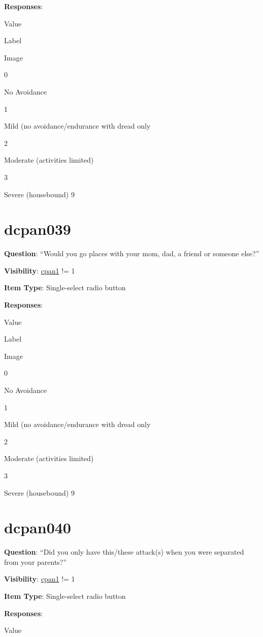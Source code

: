 \documentclass[]{book}
\begin{document}
\textbf{Responses}:

Value

Label

Image

0

No Avoidance

1

Mild (no avoidance/endurance with dread only

2

Moderate (activities limited)

3

Severe (housebound)\textbar{} 9

\hypertarget{dcpan039}{%
\section{dcpan039}\label{dcpan039}}

\textbf{Question}: ``Would you go places with your mom, dad, a friend or someone else?''

\textbf{Visibility}: \protect\hyperlink{cpan1}{cpan1} != 1

\textbf{Item Type}: Single-select radio button

\textbf{Responses}:

Value

Label

Image

0

No Avoidance

1

Mild (no avoidance/endurance with dread only

2

Moderate (activities limited)

3

Severe (housebound)\textbar{} 9

\hypertarget{dcpan040}{%
\section{dcpan040}\label{dcpan040}}

\textbf{Question}: ``Did you only have this/these attack(s) when you were separated from your parents?''

\textbf{Visibility}: \protect\hyperlink{cpan1}{cpan1} != 1

\textbf{Item Type}: Single-select radio button

\textbf{Responses}:

Value
\end{document}
